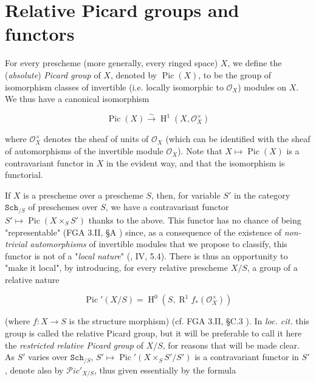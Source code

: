 \section{Relative Picard groups and functors}\label{fga3.v-1}

For every prescheme (more generally, every ringed space) $X$, we define the (\emph{absolute}) \emph{Picard group} of $X$, denoted by $\operatorname{Pic}(X)$, to be the group of isomorphism classes of invertible (i.e. locally isomorphic to $\mathcal{O}_X$) modules on $X$.
We thus have a canonical isomorphism

\begin{equation}\tag{1.1}\label{fga3.v-1-equation-1.1}
    \operatorname{Pic}(X) \xrightarrow{\sim} \operatorname{H}^1(X,\mathcal{O}_X^\times)
\end{equation}

where $\mathcal{O}_X^\times$ denotes the sheaf of units of $\mathcal{O}_X$ (which can be identified with the sheaf of automorphisms of the invertible module $\mathcal{O}_X$).
Note that $X\mapsto\operatorname{Pic}(X)$ is a contravariant functor in $X$ in the evident way, and that the isomorphism  is functorial.

If $X$ is a prescheme over a prescheme $S$, then, for variable $S'$ in the category $\mathtt{Sch}_{/S}$ of preschemes over $S$, we have a contravariant functor $S'\mapsto\operatorname{Pic}(X\times_S S')$ thanks to the above.
This functor has no chance of being "representable" (FGA 3.II, §A ) since, as a consequence of the existence of \emph{non-trivial automorphisms} of invertible modules that we propose to classify, this functor is not of a "\emph{local nature}" (\cite{Gro1960a}, IV, 5.4).
There is thus an opportunity to "make it local", by introducing, for every relative prescheme $X/S$, a group of a relative nature

\begin{equation}\tag{1.2}\label{fga3.v-1-equation-1.2}
    \operatorname{Pic}'(X/S) = \operatorname{H}^0(S,\operatorname{R}^1f_*(\mathcal{O}_X^\times))
\end{equation}

(where $f\colon X\to S$ is the structure morphism) (cf. FGA 3.II, §C.3 ).
In \emph{loc. cit.} this group is called the relative Picard group, but it will be preferable to call it here the \emph{restricted relative Picard group} of $X/S$, for reasons that will be made clear.
As $S'$ varies over $\mathtt{Sch}_{/S}$, $S'\mapsto\operatorname{Pic}'(X\times_S S'/S')$ is a contravariant functor in $S'$, denote also by $\mathcal{P}ic'_{X/S}$, thus given essentially by the formula

